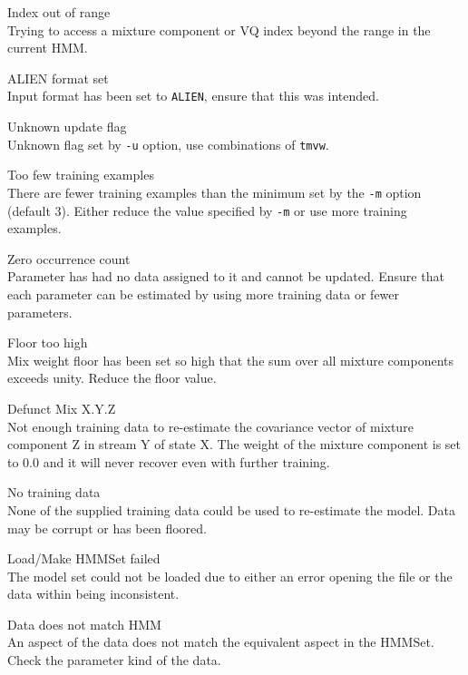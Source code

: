 \begin{itemize}
\begin{itemize}
    Index out of range\\
        Trying to access a mixture component or VQ index beyond the
        range in the current HMM.

    ALIEN format set\\
        Input format has been set to \texttt{ALIEN}, ensure that this was 
        intended.

\end{itemize}


\begin{itemize}
    Unknown update flag\\
        Unknown flag set by \texttt{-u} option, use combinations of 
        \texttt{tmvw}.

    Too few training examples\\
        There are fewer training examples than the minimum set by the 
        \texttt{-m} option (default 3).  Either reduce the value specified
        by \texttt{-m} or use more training examples.

    Zero occurrence count\\
        Parameter has had no data assigned to it and cannot be
        updated.  Ensure that each parameter can be estimated by
        using more training data or fewer parameters.

    Floor too high\\
        Mix weight floor has been set so high that the sum over all 
        mixture components exceeds unity.  Reduce the floor value.

    Defunct Mix X.Y.Z \\
        Not enough training data to re-estimate the covariance vector of
        mixture component Z in stream Y of state X. The weight of the mixture
        component is set to 0.0 and it will never recover even with further
        training.

    No training data\\
        None of the supplied training data could be used to
        re-estimate the model. Data may be corrupt or has been floored.

    Load/Make HMMSet failed\\
        The model set could not be loaded due to either an error opening the
        file or the data within being inconsistent.

    Data does not match HMM\\
        An aspect of the data does not match the equivalent aspect in 
        the HMMSet.  Check the parameter kind of the data.


\end{itemize}
\end{itemize}
